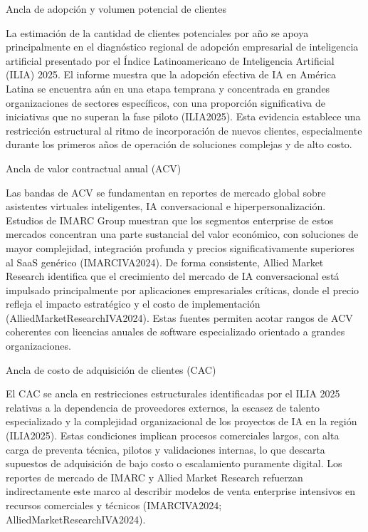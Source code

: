 \begin{APACode}
Ancla de adopción y volumen potencial de clientes

La estimación de la cantidad de clientes potenciales por año se apoya principalmente en el diagnóstico regional de adopción empresarial de inteligencia artificial presentado por el Índice Latinoamericano de Inteligencia Artificial (ILIA) 2025. El informe muestra que la adopción efectiva de IA en América Latina se encuentra aún en una etapa temprana y concentrada en grandes organizaciones de sectores específicos, con una proporción significativa de iniciativas que no superan la fase piloto (ILIA2025). Esta evidencia establece una restricción estructural al ritmo de incorporación de nuevos clientes, especialmente durante los primeros años de operación de soluciones complejas y de alto costo.

Ancla de valor contractual anual (ACV)

Las bandas de ACV se fundamentan en reportes de mercado global sobre asistentes virtuales inteligentes, IA conversacional e hiperpersonalización. Estudios de IMARC Group muestran que los segmentos enterprise de estos mercados concentran una parte sustancial del valor económico, con soluciones de mayor complejidad, integración profunda y precios significativamente superiores al SaaS genérico (IMARCIVA2024). De forma consistente, Allied Market Research identifica que el crecimiento del mercado de IA conversacional está impulsado principalmente por aplicaciones empresariales críticas, donde el precio refleja el impacto estratégico y el costo de implementación (AlliedMarketResearchIVA2024). Estas fuentes permiten acotar rangos de ACV coherentes con licencias anuales de software especializado orientado a grandes organizaciones.

Ancla de costo de adquisición de clientes (CAC)

El CAC se ancla en restricciones estructurales identificadas por el ILIA 2025 relativas a la dependencia de proveedores externos, la escasez de talento especializado y la complejidad organizacional de los proyectos de IA en la región (ILIA2025). Estas condiciones implican procesos comerciales largos, con alta carga de preventa técnica, pilotos y validaciones internas, lo que descarta supuestos de adquisición de bajo costo o escalamiento puramente digital. Los reportes de mercado de IMARC y Allied Market Research refuerzan indirectamente este marco al describir modelos de venta enterprise intensivos en recursos comerciales y técnicos (IMARCIVA2024; AlliedMarketResearchIVA2024).


\end{APACode}
